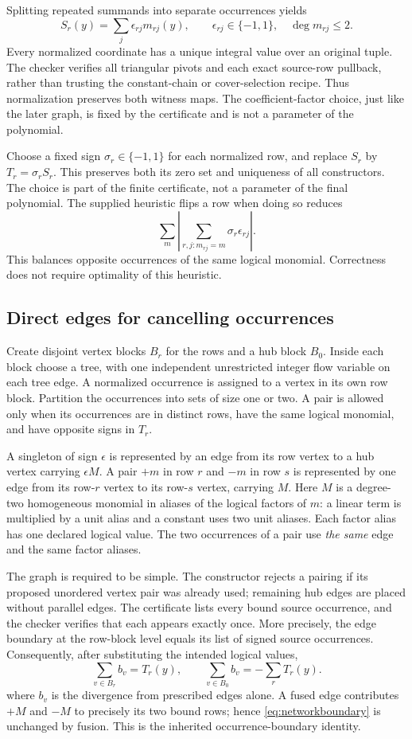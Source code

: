 Splitting repeated summands into separate occurrences yields
\[
 S_r(y)=\sum_j\epsilon_{rj}m_{rj}(y),\qquad \epsilon_{rj}\in\{-1,1\},
 \quad \deg m_{rj}\le2.
\]
Every normalized coordinate has a unique integral value over an original
tuple. The checker verifies all triangular pivots and each exact source-row
pullback, rather than trusting the constant-chain or cover-selection
recipe. Thus normalization preserves both witness maps. The coefficient-factor choice, just like the later graph,
is fixed by the certificate and is not a parameter of the polynomial.

Choose a fixed sign $\sigma_r\in\{-1,1\}$ for each normalized row, and
replace $S_r$ by $T_r=\sigma_rS_r$. This preserves both its zero set and
uniqueness of all constructors. The choice is part of the finite
certificate, not a parameter of the final polynomial. The supplied
heuristic flips a row when doing so reduces
\[
 \sum_m\left|\sum_{r,j:m_{rj}=m}\sigma_r\epsilon_{rj}\right|.
\]
This balances opposite occurrences of the same logical monomial.
Correctness does not require optimality of this heuristic.

\subsection{Direct edges for cancelling occurrences}
Create disjoint vertex blocks $B_r$ for the rows and a hub block $B_0$.
Inside each block choose a tree, with one independent unrestricted integer
flow variable on each tree edge. A normalized occurrence is assigned to a
vertex in its own row block. Partition the occurrences into sets of size
one or two. A pair is allowed only when its occurrences are in distinct
rows, have the same logical monomial, and have opposite signs in $T_r$.

A singleton of sign $\epsilon$ is represented by an edge from its row
vertex to a hub vertex carrying $\epsilon M$. A pair $+m$ in row $r$ and
$-m$ in row $s$ is represented by one edge from its row-$r$ vertex to its
row-$s$ vertex, carrying $M$. Here $M$ is a degree-two homogeneous
monomial in aliases of the logical factors of $m$: a linear term is
multiplied by a unit alias and a constant uses two unit aliases. Each factor
alias has one declared logical value. The two occurrences of a pair use
\emph{the same} edge and the same factor aliases.

The graph is required to be simple. The constructor rejects a pairing if
its proposed unordered vertex pair was already used; remaining hub edges
are placed without parallel edges. The certificate lists every bound
source occurrence, and the checker verifies that each appears exactly
once. More precisely, the edge boundary at the row-block level equals its
list of signed source occurrences. Consequently, after substituting the
intended logical values,
\begin{equation}\label{eq:networkboundary}
 \sum_{v\in B_r} b_v=T_r(y),\qquad
 \sum_{v\in B_0} b_v=-\sum_rT_r(y).
\end{equation}
where $b_v$ is the divergence from prescribed edges alone. A fused edge
contributes $+M$ and $-M$ to precisely its two bound rows; hence \eqref{eq:networkboundary} is
unchanged by fusion. This is the inherited occurrence-boundary identity.


